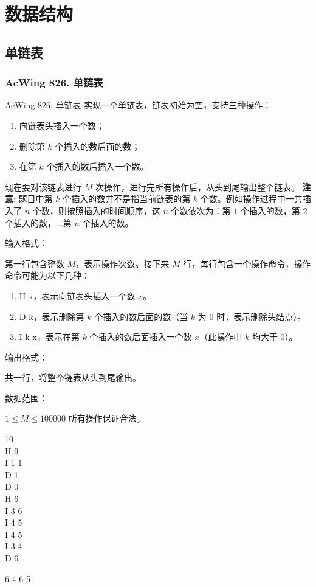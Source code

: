 \chapter{数据结构}

\section{单链表}
\subsection{AcWing 826. 单链表}

\begin{titledbox}{AcWing 826. 单链表}
实现一个单链表，链表初始为空，支持三种操作：
\begin{enumerate}
    \itemsep=-5pt
    \item 向链表头插入一个数；
    \item 删除第 $k$ 个插入的数后面的数；
    \item 在第 $k$ 个插入的数后插入一个数。
\end{enumerate}

现在要对该链表进行 $M$ 次操作，进行完所有操作后，从头到尾输出整个链表。
\textbf{注意}: 题目中第 $k$ 个插入的数并不是指当前链表的第 $k$ 个数。例如操作过程中一共插入了 $n$ 个数，则按照插入的时间顺序，这 $n$ 个数依次为：第 $1$ 个插入的数，第 $2$ 个插入的数，$\dots$第 $n$ 个插入的数。

输入格式：

第一行包含整数 $M$，表示操作次数。接下来 $M$ 行，每行包含一个操作命令，操作命令可能为以下几种：

\begin{enumerate}
    \itemsep=-5pt
    \item H x，表示向链表头插入一个数 $x$。
    \item D k，表示删除第 $k$ 个插入的数后面的数（当 $k$ 为 $0$ 时，表示删除头结点）。
    \item I k x，表示在第 $k$ 个插入的数后面插入一个数 $x$（此操作中 $k$ 均大于 $0$）。
\end{enumerate}

输出格式：

共一行，将整个链表从头到尾输出。

数据范围：

$1 \le M \le 100000$ 所有操作保证合法。

\begin{inputblock}
    10 \\
    H 9 \\
    I 1 1 \\
    D 1 \\
    D 0 \\
    H 6 \\
    I 3 6 \\
    I 4 5 \\
    I 4 5 \\
    I 3 4 \\
    D 6
\end{inputblock}
\begin{outputblock}
    6 4 6 5
\end{outputblock}
\end{titledbox}

